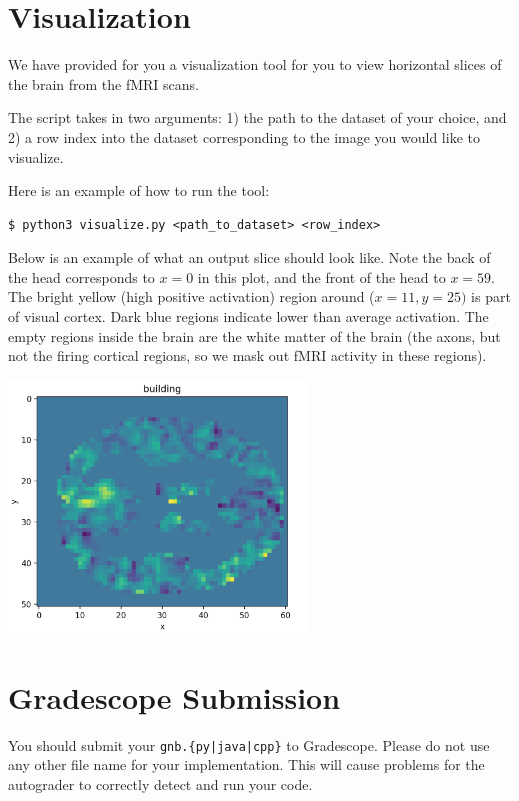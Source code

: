 \documentclass[11pt,addpoints,answers]{exam}
\begin{document}
\section{Visualization}
We have provided for you a visualization tool for you to view horizontal slices of the brain from the fMRI scans.

The script takes in two arguments: 1) the path to the dataset of your choice, and 2) a row index into the dataset corresponding to the image you would like to visualize. 

Here is an example of how to run the tool: 
\\
\begin{lstlisting}[language=Shell]
$ python3 visualize.py <path_to_dataset> <row_index>
\end{lstlisting}


Below is an example of what an output slice should look like. Note the back of the head corresponds to $x=0$ in this plot, and the front of the head to $x=59$. The bright yellow (high positive activation) region around ($x=11, y=25)$ is part of visual cortex. Dark blue regions indicate lower than average activation.  The empty regions inside the brain are the white matter of the brain (the axons, but not the firing cortical regions, so we mask out fMRI activity in these regions).


\begin{center}
\includegraphics[width=300px]{images/visualization.png}
\end{center}

\section{Gradescope Submission}
You should submit your \texttt{gnb.\{py|java|cpp\}} to Gradescope. Please do not use any other file name for your implementation. This will cause problems for the autograder to correctly detect and run your code.
\newpage
\end{document}
